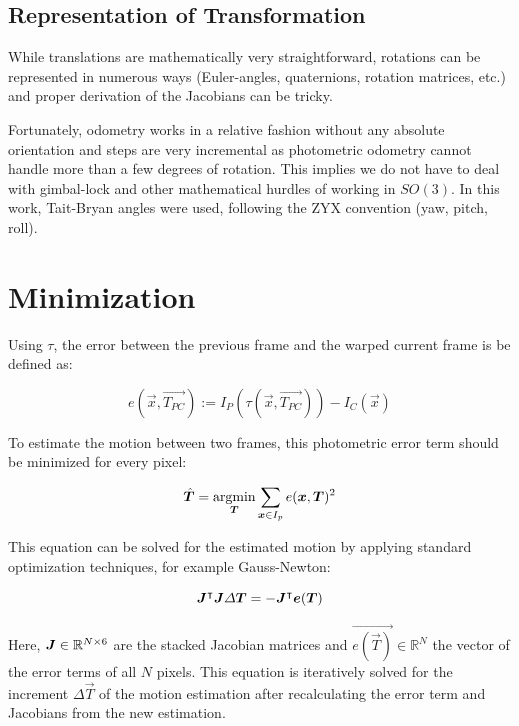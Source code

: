 \subsection{Representation of Transformation}

While translations are mathematically very straightforward, rotations can be
represented in numerous ways (Euler-angles, quaternions, rotation matrices,
etc.) and proper derivation of the Jacobians can be tricky.

Fortunately, odometry works in a relative fashion without any absolute
orientation and steps are very incremental as photometric odometry cannot
handle more than a few degrees of rotation. This implies we do not have to deal
with gimbal-lock and other mathematical hurdles of working in $SO(3)$. In this
work, Tait-Bryan angles were used, following the ZYX convention (yaw, pitch,
roll).




\section{Minimization}

Using $\tau$, the error between the previous frame and the warped current frame is be defined as:

\begin{equation}
    \label{eq:error}
    e(\vec{x}, \vec{T_{PC}}) := I_P(\tau(\vec{x}, \vec{T_{PC}})) - I_C(\vec{x})
\end{equation}


To estimate the motion between two frames, this photometric error term should
be minimized for every pixel:

\begin{equation}
    \vec{\hat{T}} = \operatornamewithlimits{argmin}_{\vec{T}} \sum_{\vec{x} \in I_p} e(\vec{x}, \vec{T})^2
\end{equation}


This equation can be solved for the estimated motion by applying standard
optimization techniques, for example Gauss-Newton:

\begin{equation}
    \mat{J}^\intercal \mat{J} \Delta \vec{T} = - \mat{J}^\intercal \vec{e(\vec{T})}
\end{equation}

Here, $\mat{J} \in \mathbb{R}^{N \times 6}$ are the stacked Jacobian matrices
and $\vec{e(\vec{T})} \in \mathbb{R}^N$ the vector of the error terms of all
$N$ pixels.  This equation is iteratively solved for the increment $\Delta
\vec{T}$ of the motion estimation after recalculating the error term and
Jacobians from the new estimation.

